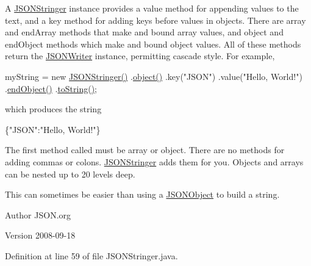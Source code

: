 A \hyperlink{classorg_1_1json_1_1_j_s_o_n_stringer}{J\-S\-O\-N\-Stringer} instance provides a {\ttfamily value} method for appending values to the text, and a {\ttfamily key} method for adding keys before values in objects. There are {\ttfamily array} and {\ttfamily end\-Array} methods that make and bound array values, and {\ttfamily object} and {\ttfamily end\-Object} methods which make and bound object values. All of these methods return the \hyperlink{classorg_1_1json_1_1_j_s_o_n_writer}{J\-S\-O\-N\-Writer} instance, permitting cascade style. For example, 
\begin{DoxyPre}
myString = new \hyperlink{classorg_1_1json_1_1_j_s_o_n_stringer_a36d3accdcf3f40434edd9c33b414d3f9}{JSONStringer()}
    .\hyperlink{classorg_1_1json_1_1_j_s_o_n_writer_a50ed212b9c8c9f6a57c3ddfc6bf3126a}{object()}
        .key("JSON")
        .value("Hello, World!")
    .\hyperlink{classorg_1_1json_1_1_j_s_o_n_writer_a25cc931ef86998c61f08b1d5eff22146}{endObject()}
    .\hyperlink{classorg_1_1json_1_1_j_s_o_n_stringer_a2e7f28e99eb46f767b5df8a669e774b4}{toString()};\end{DoxyPre}
 which produces the string 
\begin{DoxyPre}
\{"JSON":"Hello, World!"\}\end{DoxyPre}
 

The first method called must be {\ttfamily array} or {\ttfamily object}. There are no methods for adding commas or colons. \hyperlink{classorg_1_1json_1_1_j_s_o_n_stringer}{J\-S\-O\-N\-Stringer} adds them for you. Objects and arrays can be nested up to 20 levels deep. 

This can sometimes be easier than using a \hyperlink{classorg_1_1json_1_1_j_s_o_n_object}{J\-S\-O\-N\-Object} to build a string. \begin{DoxyAuthor}{Author}
J\-S\-O\-N.\-org 
\end{DoxyAuthor}
\begin{DoxyVersion}{Version}
2008-\/09-\/18 
\end{DoxyVersion}


Definition at line 59 of file J\-S\-O\-N\-Stringer.\-java.



